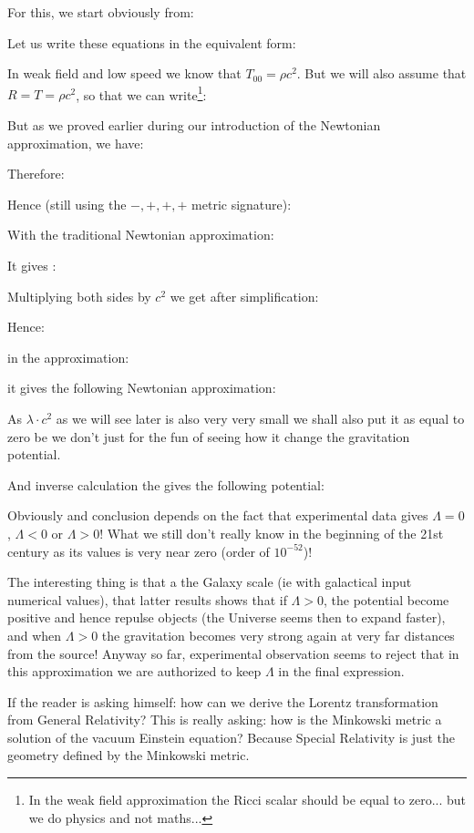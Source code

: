 	For this, we start obviously from:
	
	Let us write these equations in the equivalent form:
	
	In weak field and low speed we know that $T_{00}=\rho c^2$. But we will also assume that $R=T=\rho c^2$, so that we can write\footnote{In the weak field approximation the Ricci scalar should be equal to zero... but we do physics and not maths...}:
	
	But as we proved earlier during our introduction of the Newtonian approximation, we have:
	
	Therefore:
	
	Hence (still using the $-,+,+,+$ metric signature):
	
	With the traditional Newtonian approximation:
	
	It gives :
	
	Multiplying both sides by $c^2$ we get after simplification:
	
	Hence:
	
	in the approximation:
	
	it gives the following Newtonian approximation:
	
	As $\lambda \cdot c^2$ as we will see later is also very very small we shall also put it as equal to zero be we don't just for the fun of seeing how it change the gravitation potential.
	\begin{tcolorbox}[title=Remark,colframe=black,arc=10pt]
	And inverse calculation the gives the following potential:
	
	Obviously and conclusion depends on the fact that experimental data gives $\Lambda=0$, $\Lambda<0$ or $\Lambda>0$! What we still don't really know in the beginning of the 21st century as its values is very near zero (order of $10^{-52}$)!
	\end{tcolorbox}
	The interesting thing is that a the Galaxy scale (ie with galactical input numerical values), that latter results shows that if $\Lambda>0$, the potential become positive and hence repulse objects (the Universe seems then to expand faster), and when $\Lambda>0$ the gravitation becomes very strong again at very far distances from the source! Anyway so far, experimental observation seems to reject that in this approximation we are authorized to keep $\Lambda$ in the final expression.
	
	If the reader is asking himself: how can we derive the Lorentz transformation from General Relativity? This is really asking: how is the Minkowski metric a solution of the vacuum Einstein equation? Because Special Relativity is just the geometry defined by the Minkowski metric.

